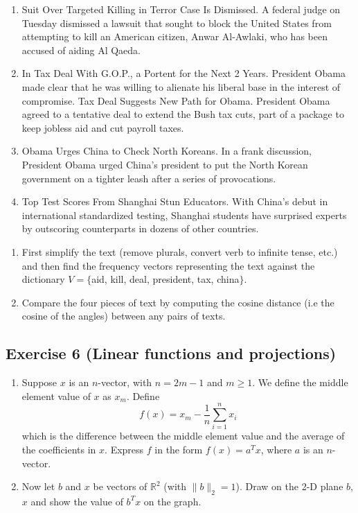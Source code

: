 \documentclass[11pt]{article}
\begin{document}
\begin{enumerate}[label=(\alph*)]
    \item Suit Over Targeted Killing in Terror Case Is Dismissed. A federal judge on Tuesday dismissed a lawsuit that sought to block the United States from attempting to kill an American citizen, Anwar Al-Awlaki, who has been accused of aiding Al Qaeda.

    \item In Tax Deal With G.O.P., a Portent for the Next 2 Years. President Obama made clear that he was willing to alienate his liberal base in the interest of compromise. Tax Deal Suggests New Path for Obama. President Obama agreed to a tentative deal to extend the Bush tax cuts, part of a package to keep jobless aid and cut payroll taxes.

    \item Obama Urges China to Check North Koreans. In a frank discussion, President Obama urged China's president to put the North Korean government on a tighter leash after a series of provocations.

    \item Top Test Scores From Shanghai Stun Educators. With China's debut in international standardized testing, Shanghai students have surprised experts by outscoring counterparts in dozens of other countries.
\end{enumerate}

\begin{enumerate}
    \item
    First simplify the text (remove plurals, convert verb to infinite tense, etc.) and then find the frequency vectors   representing the text against the dictionary $V=\{$aid, kill, deal, president, tax, china$\}$.

    \item Compare the four pieces of text by computing the cosine distance (i.e the cosine of the angles) between any pairs of texts.
\end{enumerate}

\begin{solution}
\end{solution}

\newpage
\subsection*{Exercise 6 (Linear functions and projections)}

\begin{enumerate}
    \item Suppose $x$ is an $n$-vector, with $n = 2m - 1$ and $m \geq 1$. We define the middle element value of $x$ as $x_m$. Define $$f(x) = x_m - \frac{1}{n}\sum_{i = 1}^n x_i$$ which is the difference between the middle element value and the average of the coefficients in $x$. Express $f$ in the form $f(x) = a^Tx$, where $a$ is an $n$-vector.

    \item Now let $b$ and $x$ be vectors of $\mathbb{R}^2$ (with $\|b\|_2 = 1$). Draw on the 2-D plane $b$, $x$ and show the value of $b^Tx$ on the graph.
\end{enumerate}
\end{document}
